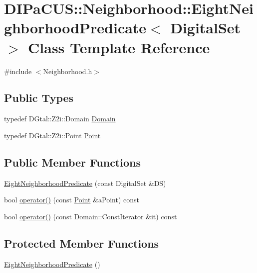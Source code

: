 \hypertarget{classDIPaCUS_1_1Neighborhood_1_1EightNeighborhoodPredicate}{}\section{D\+I\+Pa\+C\+US\+:\+:Neighborhood\+:\+:Eight\+Neighborhood\+Predicate$<$ Digital\+Set $>$ Class Template Reference}
\label{classDIPaCUS_1_1Neighborhood_1_1EightNeighborhoodPredicate}


{\ttfamily \#include $<$Neighborhood.\+h$>$}

\subsection*{Public Types}
\begin{DoxyCompactItemize}
\item 
typedef D\+Gtal\+::\+Z2i\+::\+Domain \mbox{\hyperlink{classDIPaCUS_1_1Neighborhood_1_1EightNeighborhoodPredicate_accd4ba38b8e605d949206135f0a3de61}{Domain}}
\item 
typedef D\+Gtal\+::\+Z2i\+::\+Point \mbox{\hyperlink{classDIPaCUS_1_1Neighborhood_1_1EightNeighborhoodPredicate_afd5b888b29042dd8ea3da17b3c3ee8cb}{Point}}
\end{DoxyCompactItemize}
\subsection*{Public Member Functions}
\begin{DoxyCompactItemize}
\item 
\mbox{\hyperlink{classDIPaCUS_1_1Neighborhood_1_1EightNeighborhoodPredicate_a1837b60e370bcea807d6663c596214bb}{Eight\+Neighborhood\+Predicate}} (const Digital\+Set \&DS)
\item 
bool \mbox{\hyperlink{classDIPaCUS_1_1Neighborhood_1_1EightNeighborhoodPredicate_a6c2b7032c940a0f607ce495ece6f3f23}{operator()}} (const \mbox{\hyperlink{classDIPaCUS_1_1Neighborhood_1_1EightNeighborhoodPredicate_afd5b888b29042dd8ea3da17b3c3ee8cb}{Point}} \&a\+Point) const
\item 
bool \mbox{\hyperlink{classDIPaCUS_1_1Neighborhood_1_1EightNeighborhoodPredicate_a65c20f2831aa238b1095a271e2f4fca7}{operator()}} (const Domain\+::\+Const\+Iterator \&it) const
\end{DoxyCompactItemize}
\subsection*{Protected Member Functions}
\begin{DoxyCompactItemize}
\item 
\mbox{\hyperlink{classDIPaCUS_1_1Neighborhood_1_1EightNeighborhoodPredicate_ac854d645c83febba06718ef4a1091fc7}{Eight\+Neighborhood\+Predicate}} ()
\end{DoxyCompactItemize}


